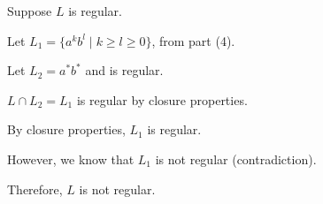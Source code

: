 \documentclass{article}
\theoremstyle{definition}
\newenvironment {solution}
{
\begin{tcolorbox}
}
{
\end{tcolorbox}
}
\begin{document}
\begin{enumerate}
    \begin{solution}
        Suppose $L$ is regular. 
        
        Let $L_1 = \{a^kb^l \mid k \geq l \geq 0\}$, from part (4).
        
        Let $L_2 = a^*b^*$ and is regular. 
        
        $L \cap L_2 = L_1$ is regular by closure properties.
        
        By closure properties, $L_1$ is regular.

        However, we know that $L_1$ is not regular (contradiction). 
        
        Therefore, $L$ is not regular.
    \end{solution}



\end{enumerate}
\end{document}
